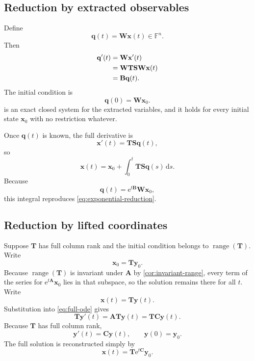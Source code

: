 \documentclass[11pt]{article}
\newcommand{\F}{\mathbb{F}}
\newcommand{\mat}[1]{\mathbf{#1}}
\newcommand{\vect}[1]{\mathbf{#1}}
\newcommand{\range}{\operatorname{range}}
\newcommand{\e}{\mathrm{e}}
\newcommand{\dd}{\mathrm{d}}
\theoremstyle{definition}
\theoremstyle{remark}
\begin{document}
\subsection{Reduction by extracted observables}

Define
\begin{equation}
  \vect{q}(t)=\mat{W}\vect{x}(t)\in\F^n.
  \label{eq:q-definition}
\end{equation}
Then
\begin{align}
  \vect{q}'(t)
  &=\mat{W}\vect{x}'(t)\notag\\
  &=\mat{W}\mat{T}\mat{S}\mat{W}\vect{x}(t)\notag\\
  &=\mat{B}\vect{q}(t).
  \label{eq:q-reduced-ode}
\end{align}
The initial condition is
\begin{equation}
  \vect{q}(0)=\mat{W}\vect{x}_0.
  \label{eq:q-initial}
\end{equation}
 is an exact closed system for the extracted variables, and it holds for every initial state \(\vect{x}_0\) with no restriction whatever.

Once \(\vect{q}(t)\) is known, the full derivative is
\begin{equation}
  \vect{x}'(t)=\mat{T}\mat{S}\vect{q}(t),
  \label{eq:xprime-from-q}
\end{equation}
so
\begin{equation}
  \vect{x}(t)
  =\vect{x}_0+
   \int_0^t\mat{T}\mat{S}\vect{q}(s)\,\dd s.
  \label{eq:x-reconstruction-integral}
\end{equation}
Because
\[
  \vect{q}(t)=\e^{t\mat{B}}\mat{W}\vect{x}_0,
\]
this integral reproduces \cref{eq:exponential-reduction}.

\subsection{Reduction by lifted coordinates}

Suppose \(\mat{T}\) has full column rank and the initial condition belongs to \(\range(\mat{T})\). Write
\begin{equation}
  \vect{x}_0=\mat{T}\vect{y}_0.
  \label{eq:x0-in-range}
\end{equation}
Because \(\range(\mat{T})\) is invariant under \(\mat{A}\) by \cref{cor:invariant-range}, every term of the series for \(\e^{t\mat{A}}\vect{x}_0\) lies in that subspace, so the solution remains there for all \(t\). Write
\begin{equation}
  \vect{x}(t)=\mat{T}\vect{y}(t).
  \label{eq:x-Ty}
\end{equation}
Substitution into \cref{eq:full-ode} gives
\[
  \mat{T}\vect{y}'(t)
  =\mat{A}\mat{T}\vect{y}(t)
  =\mat{T}\mat{C}\vect{y}(t).
\]
Because \(\mat{T}\) has full column rank,
\begin{equation}
  \vect{y}'(t)=\mat{C}\vect{y}(t),
  \qquad
  \vect{y}(0)=\vect{y}_0.
  \label{eq:y-reduced-ode}
\end{equation}
The full solution is reconstructed simply by
\begin{equation}
  \vect{x}(t)=\mat{T}\e^{t\mat{C}}\vect{y}_0.
  \label{eq:x-from-y}
\end{equation}
\end{document}
